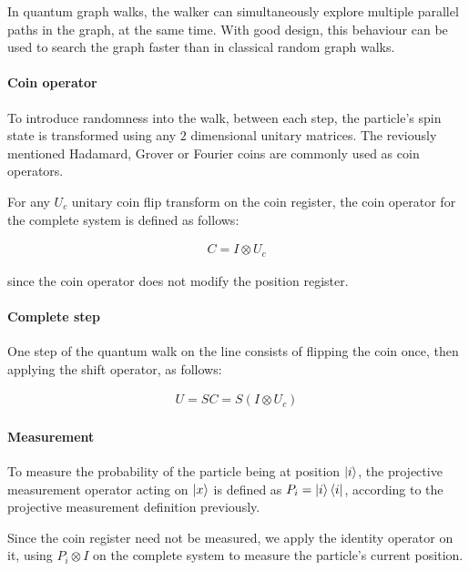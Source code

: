 In quantum graph walks, the walker can simultaneously explore multiple parallel paths in the graph, at the same time. With good design, this behaviour can be used to search the graph faster than in classical random graph walks.


\paragraph{Coin operator}

To introduce randomness into the walk, between each step, the particle's spin state is transformed using any $2$ dimensional unitary matrices. The reviously mentioned Hadamard, Grover or Fourier coins are commonly used as coin operators.

For any $U_c$ unitary coin flip transform on the coin register, the coin operator for the complete system is defined as follows:

\begin{align}
    C = I \otimes U_c
\end{align}

since the coin operator does not modify the position register.

\paragraph{Complete step}

One step of the quantum walk on the line consists of flipping the coin once, then applying the shift operator, as follows:

\begin{align}
    U = SC = S(I\otimes{}U_c)
\end{align}

\paragraph{Measurement}

To measure the probability of the particle being at position $\ket{i}$, the projective measurement operator acting on $\ket{x}$ is defined as $P_i = \ket{i}\bra{i}$, according to the projective measurement definition previously.


Since the coin register need not be measured, we apply the identity operator on it, using $P_i \otimes I$ on the complete system to measure the particle's current position.

